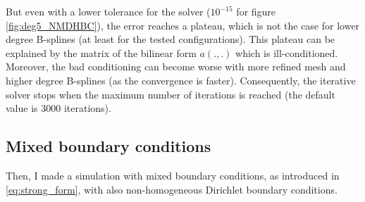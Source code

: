 \documentclass[a4paper,12pt,twoside]{report}
\begin{document}
But even with a lower tolerance for the solver ($10^{-15}$ for figure \ref{fig:deg5_NMDHBC}), the error reaches a plateau, which is not the case for lower degree B-splines (at least for the tested configurations). This plateau can be explained by the matrix of the bilinear form $a(.,.)$ which is ill-conditioned. Moreover, the bad conditioning can become worse with more refined mesh and higher degree B-splines (as the convergence is faster). Consequently, the iterative solver stops when the maximum number of iterations is reached (the default value is $3000$ iterations).

\subsection{Mixed boundary conditions}
\label{sec:mixed_BC}

Then, I made a simulation with mixed boundary conditions, as introduced in \eqref{eq:strong_form}, with also non-homogeneous Dirichlet boundary conditions.
\end{document}
